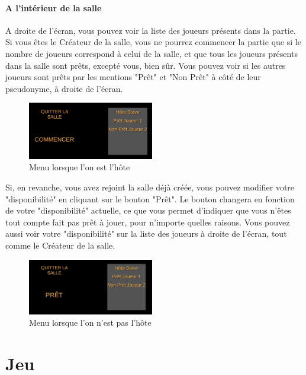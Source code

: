 \documentclass{article}
\begin{document}
\paragraph{A l'intérieur de la salle}
A droite de l'écran, vous pouvez voir la liste des joueurs présents dans la partie. Si vous êtes le Créateur de la salle, vous ne pourrez commencer la partie que si le nombre de joueurs correspond à celui de la salle, et que tous les joueurs présents dans la salle sont prêts, excepté vous, bien sûr. Vous pouvez voir si les autres joueurs sont prêts par les mentions "Prêt" et "Non Prêt" à côté de leur pseudonyme, à droite de l'écran.

\begin{figure}[H]
	\centering
	\includegraphics[width=0.49\textwidth]{Menu31.png}
	\caption{Menu lorsque l'on est l'hôte}
	\label{Menu lorsque l'on est l'hôte}
\end{figure}

Si, en revanche, vous avez rejoint la salle déjà créée, vous pouvez modifier votre "disponibilité" en cliquant sur le bouton "Prêt". Le bouton changera en fonction de votre "disponibilité" actuelle, ce que vous permet d'indiquer que vous n'êtes tout compte fait pas prêt à jouer, pour n'importe quelles raisons. Vous pouvez aussi voir votre "disponibilité" sur la liste des joueurs à droite de l'écran, tout comme le Créateur de la salle. 

\begin{figure}[H]
	\centering
	\includegraphics[width=0.49\textwidth]{Menu32.png}
	\caption{Menu lorsque l'on n'est pas l'hôte}
	\label{Menu lorsque l'on n'est pas l'hôte}
\end{figure}

\newpage
\section{Jeu}
\end{document}
